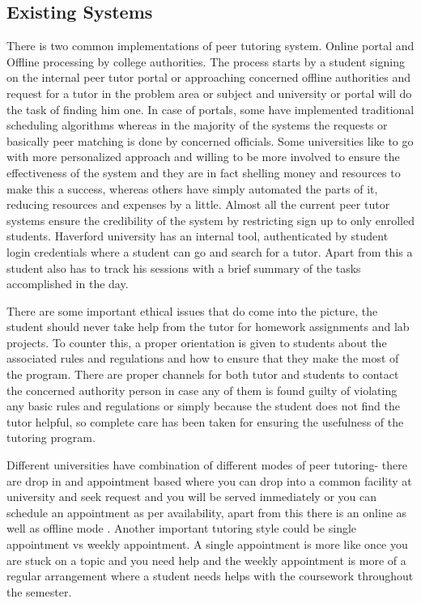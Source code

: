 \documentclass{sig-alternate-05-2015}
\begin{document}
\subsection{Existing Systems}
There is two common implementations of peer tutoring system. Online portal and Offline processing by college authorities\cite{Evans:onlinePT}. The process starts by a student signing on the internal peer tutor portal or approaching concerned offline authorities and request for a tutor in the problem area or subject and university or portal will do the task of finding him one. In case of portals, some have implemented traditional scheduling algorithms whereas in the majority of the systems the requests or basically peer matching is done by concerned officials. Some universities like to go with more personalized approach and willing to be more involved to ensure the effectiveness of the system and they are in fact shelling money and resources to make this a success, whereas others have simply automated the parts of it, reducing resources and expenses by a little.
Almost all the current peer tutor systems ensure the credibility of the system by restricting sign up to only enrolled students. Haverford university has an internal tool, authenticated by student login credentials where a student can go and search for a tutor. Apart from this a student also has to track his sessions with a brief summary of the tasks accomplished in the day.

There are some important ethical issues that do come into the picture, the student should never take help from the tutor for homework assignments and lab projects. To counter this, a  proper orientation is given to students about the associated rules and regulations and how to ensure that they make the most of the program. There are proper channels for both tutor and students to contact the concerned authority person in case any of them is found guilty of violating any basic rules and regulations or simply because the student does not find the tutor helpful, so complete care has been taken for ensuring the usefulness of the tutoring program.

Different universities have combination of different modes of peer tutoring- there are drop in and appointment based where you can drop into a common facility at university and seek request and you will be served immediately or you can schedule an appointment as per availability, apart from this there is an online as well as offline mode \cite{Purpose}. Another important tutoring style could be single appointment vs weekly appointment. A single appointment is more like once you are stuck on a topic and you need help and the weekly appointment is more of a regular arrangement where a student needs helps with the coursework throughout the semester. 
\end{document}
